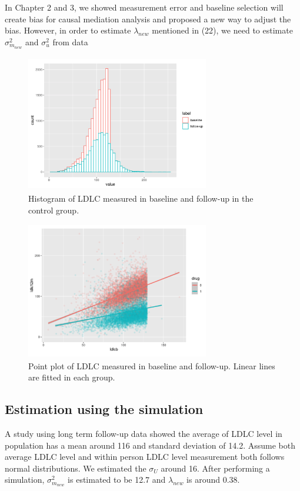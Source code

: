 \documentclass{article}
\begin{document}
In Chapter 2 and 3, we showed measurement error and baseline selection will create bias for causal mediation analysis and proposed a new way to adjust the bias. However, in order to estimate $\lambda_{new}$ mentioned in (22), we need to estimate $\sigma^2_{m_{new}}$ and $\sigma^2_u$ from data


\begin{figure}[h]
\centering
\includegraphics[width = 8cm,height = 6cm]{figure-10.png}
\caption{Histogram of LDLC measured in baseline and follow-up in the control group.}
\label{fig10}
\end{figure}

\begin{figure}[h]
\centering
\includegraphics[width = 8cm,height = 6cm]{figure-11.png}
\caption{Point plot of LDLC measured in baseline and follow-up. Linear lines are fitted in each group. }
\label{fig11}
\end{figure}


\subsection{Estimation using the simulation}

A study using long term follow-up data showed the average of LDLC level in population has a mean around 116 and standard deviation of 14.2. Assume both average LDLC level and within person LDLC level measurement both follows normal distributions. We estimated the $\sigma_U$ around 16. After performing a simulation,  $\sigma^2_{m_{new}}$ is estimated to be 12.7 and $\lambda_{new}$ is around 0.38. 
\end{document}
